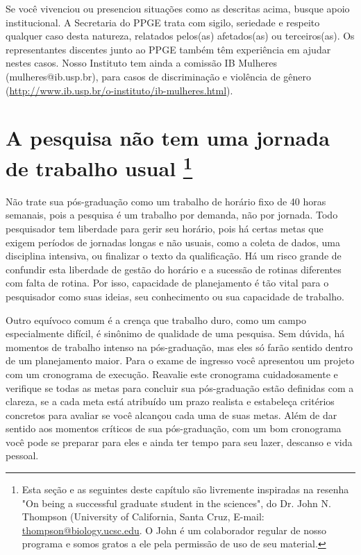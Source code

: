 \documentclass[twoside a4paper 12pt]{report}
\begin{document}
Se você vivenciou ou presenciou situações como as descritas acima, busque apoio institucional.  A Secretaria do PPGE trata com sigilo, seriedade e respeito qualquer caso desta natureza, relatados pelos(as) afetados(as) ou terceiros(as). Os representantes discentes junto ao PPGE também têm experiência em ajudar nestes casos. Nosso Instituto tem ainda a comissão IB Mulheres (mulheres@ib.usp.br), para casos de discriminação e violência de gênero (\url{http://www.ib.usp.br/o-instituto/ib-mulheres.html}). 

\section[A pesquisa não tem uma jornada de trabalho usual]{A pesquisa não tem uma jornada de trabalho usual \footnote{Esta seção e as seguintes deste capítulo são livremente inspiradas na resenha "On being a successful graduate student in the sciences", do Dr. John N. Thompson (University of California, Santa Cruz, E-mail: \url{thompson@biology.ucsc.edu}. O John é um colaborador regular de nosso programa e somos gratos a ele pela permissão de uso de seu material.}}

Não trate sua pós-graduação como um trabalho de horário fixo de 40 horas semanais, pois a pesquisa é um trabalho por demanda, não por jornada. Todo pesquisador tem liberdade para gerir seu horário, pois há certas metas que exigem períodos de jornadas longas e não usuais, como a coleta de dados, uma disciplina intensiva, ou finalizar o texto da qualificação. Há um risco grande de confundir esta liberdade de gestão do horário e a sucessão de rotinas diferentes com falta de rotina. Por isso, capacidade de planejamento é tão vital para o pesquisador como suas ideias, seu conhecimento ou sua capacidade de trabalho.

Outro equívoco comum é a crença que trabalho duro, como um campo especialmente difícil, é sinônimo de qualidade de uma pesquisa. Sem dúvida, há momentos de trabalho intenso na pós-graduação, mas eles só farão sentido dentro de um planejamento maior. Para o exame de ingresso você apresentou um projeto com um cronograma de execução. Reavalie este cronograma cuidadosamente e verifique se todas as metas para concluir sua pós-graduação estão definidas com a clareza, se a cada meta está atribuído um prazo realista e estabeleça critérios concretos para avaliar se você alcançou cada uma de suas metas. Além de dar sentido aos momentos críticos de sua pós-graduação, com um bom cronograma você pode se preparar para eles e ainda ter tempo para seu lazer, descanso e vida pessoal.
\end{document}
